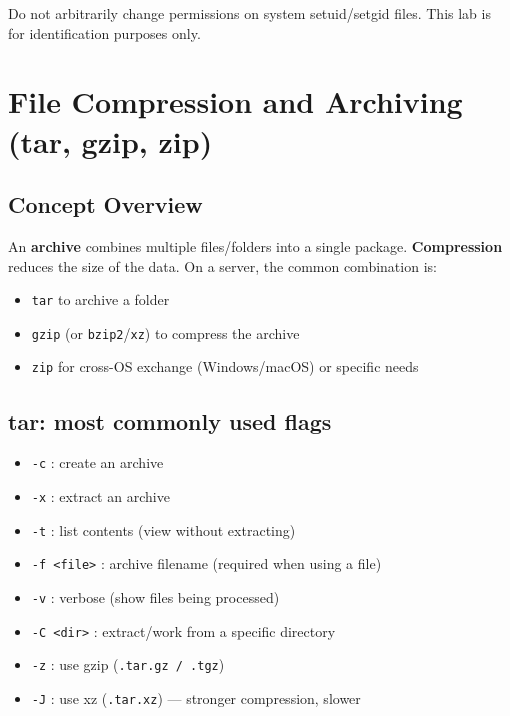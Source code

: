 \begin{warningbox}
Do not arbitrarily change permissions on system setuid/setgid files. This lab
is for identification purposes only.
\end{warningbox}

\section{File Compression and Archiving (tar, gzip, zip)}
\label{sec:archive}

\subsection*{Concept Overview}
An \textbf{archive} combines multiple files/folders into a single package.
\textbf{Compression} reduces the size of the data. On a server, the common
combination is:
\begin{itemize}
    \item \texttt{tar} to archive a folder
    \item \texttt{gzip} (or \texttt{bzip2}/\texttt{xz}) to compress the archive
    \item \texttt{zip} for cross-OS exchange (Windows/macOS) or specific needs
\end{itemize}

\subsection*{tar: most commonly used flags}
\begin{itemize}
    \item \texttt{-c} : create an archive
    \item \texttt{-x} : extract an archive
    \item \texttt{-t} : list contents (view without extracting)
    \item \texttt{-f <file>} : archive filename (required when using a file)
    \item \texttt{-v} : verbose (show files being processed)
    \item \texttt{-C <dir>} : extract/work from a specific directory
    \item \texttt{-z} : use gzip (\texttt{.tar.gz / .tgz})
    \item \texttt{-J} : use xz (\texttt{.tar.xz}) --- stronger compression, slower
\end{itemize}

